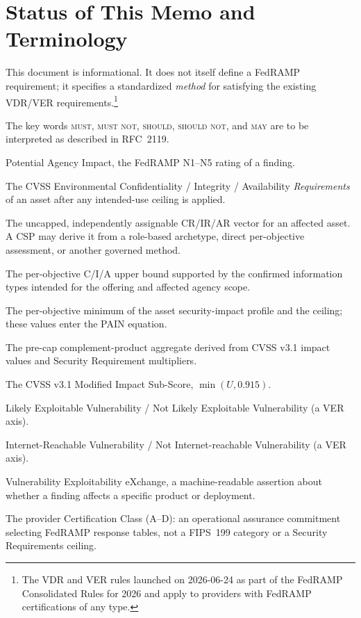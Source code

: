 \documentclass[11pt]{article}
\newcommand{\rfckw}[1]{\textsc{#1}}
\begin{document}
\tableofcontents

\section{Status of This Memo and Terminology}
This document is informational. It does not itself define a FedRAMP requirement; it
specifies a standardized \emph{method} for satisfying the existing VDR/VER
requirements.\footnote{The VDR and VER rules launched on 2026-06-24 as part of the
FedRAMP Consolidated Rules for 2026 and apply to providers with FedRAMP
certifications of any type.}

The key words \rfckw{must}, \rfckw{must not}, \rfckw{should}, \rfckw{should not},
and \rfckw{may} are to be interpreted as described in RFC~2119.

\begin{description}[leftmargin=1.5em,style=nextline]
\item[PAIN] Potential Agency Impact, the FedRAMP N1--N5 rating of a finding.
\item[CR/IR/AR] The CVSS Environmental Confidentiality / Integrity / Availability
  \emph{Requirements} of an asset after any intended-use ceiling is applied.
\item[Asset security-impact profile] The uncapped, independently assignable
  CR/IR/AR vector for an affected asset. A CSP may derive it from a role-based
  archetype, direct per-objective assessment, or another governed method.
\item[Security Requirements ceiling] The per-objective C/I/A upper bound supported
  by the confirmed information types intended for the offering and affected
  agency scope.
\item[Effective requirements] The per-objective minimum of the asset
  security-impact profile and the ceiling; these values enter the PAIN equation.
\item[$U$] The pre-cap complement-product aggregate derived from CVSS v3.1 impact
  values and Security Requirement multipliers.
\item[MISS] The CVSS v3.1 Modified Impact Sub-Score, $\min(U,0.915)$.
\item[LEV / NLEV] Likely Exploitable Vulnerability / Not Likely Exploitable
  Vulnerability (a VER axis).
\item[IRV / NIRV] Internet-Reachable Vulnerability / Not Internet-reachable
  Vulnerability (a VER axis).
\item[VEX] Vulnerability Exploitability eXchange, a machine-readable assertion about
  whether a finding affects a specific product or deployment.
\item[Class] The provider Certification Class (A--D): an operational assurance
  commitment selecting FedRAMP response tables, not a FIPS~199 category or a
  Security Requirements ceiling.
\end{description}
\end{document}
